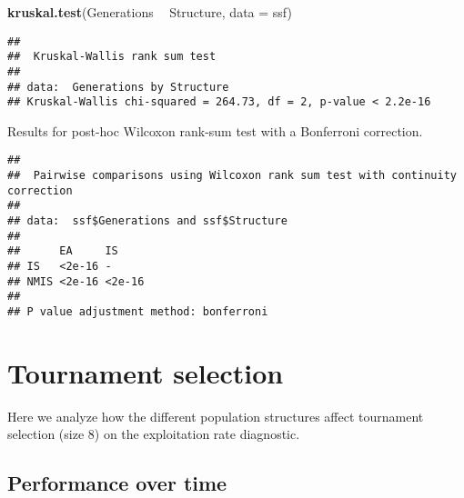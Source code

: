 \documentclass[]{book}
\newenvironment{Shaded}{\begin{snugshade}}{\end{snugshade}}
\newcommand{\DataTypeTok}[1]{\textcolor[rgb]{0.13,0.29,0.53}{#1}}
\newcommand{\KeywordTok}[1]{\textcolor[rgb]{0.13,0.29,0.53}{\textbf{#1}}}
\newcommand{\NormalTok}[1]{#1}
\newcommand{\OperatorTok}[1]{\textcolor[rgb]{0.81,0.36,0.00}{\textbf{#1}}}
\newcommand{\OtherTok}[1]{\textcolor[rgb]{0.56,0.35,0.01}{#1}}
\newcommand{\StringTok}[1]{\textcolor[rgb]{0.31,0.60,0.02}{#1}}
\begin{document}
\begin{Shaded}
\begin{Highlighting}[]
\KeywordTok{kruskal.test}\NormalTok{(Generations }\OperatorTok{~}\StringTok{ }\NormalTok{Structure, }\DataTypeTok{data =}\NormalTok{ ssf)}
\end{Highlighting}
\end{Shaded}

\begin{verbatim}
## 
##  Kruskal-Wallis rank sum test
## 
## data:  Generations by Structure
## Kruskal-Wallis chi-squared = 264.73, df = 2, p-value < 2.2e-16
\end{verbatim}

Results for post-hoc Wilcoxon rank-sum test with a Bonferroni correction.

\begin{Shaded}
\end{Shaded}

\begin{verbatim}
## 
##  Pairwise comparisons using Wilcoxon rank sum test with continuity correction 
## 
## data:  ssf$Generations and ssf$Structure 
## 
##      EA     IS    
## IS   <2e-16 -     
## NMIS <2e-16 <2e-16
## 
## P value adjustment method: bonferroni
\end{verbatim}

\hypertarget{tournament-selection-4}{%
\section{Tournament selection}\label{tournament-selection-4}}

Here we analyze how the different population structures affect tournament selection (size 8) on the exploitation rate diagnostic.

\hypertarget{performance-over-time-10}{%
\subsection{Performance over time}\label{performance-over-time-10}}
\end{document}
